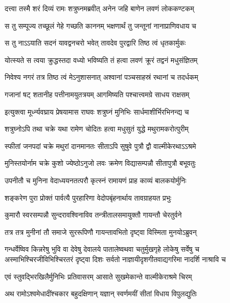 \twolineshloka
{दत्त्वा तस्मै शरं दिव्यं रामः शत्रुघ्नमब्रवीत्}
{अनेन जहि बाणेन लवणं लोककण्टकम्} %

\twolineshloka
{स तु सम्पूज्य तच्छूलं गेहे गच्छति काननम्}
{भक्षणार्थं तु जन्तूनां नानाप्राणिवधाय च} %

\twolineshloka
{स तु नाऽऽयाति सदनं यावद्वनचरो भवेत्}
{तावदेव पुरद्वारि तिष्ठ त्वं धृतकार्मुकः} %

\twolineshloka
{योत्स्यते स त्वया क्रुद्धस्तदा वध्यो भविष्यति}
{तं हत्वा लवणं क्रूरं तद्वनं मधुसंज्ञितम्} %

\twolineshloka
{निवेश्य नगरं तत्र तिष्ठ त्वं मेऽनुशासनात्}
{अश्वानां पञ्चसाहस्रं रथानां च तदर्धकम्} %

\twolineshloka
{गजानां षट् शतानीह पत्तीनामयुतत्रयम्}
{आगमिष्यति पश्चात्त्वमग्रे साधय राक्षसम्} %

\twolineshloka
{इत्युक्त्वा मूर्ध्न्यवघ्राय प्रेषयामास राघवः}
{शत्रुघ्नं मुनिभिः सार्धमाशीर्भिरभिनन्द्य च} %

\twolineshloka
{शत्रुघ्नोऽपि तथा चक्रे यथा रामेण चोदितः}
{हत्वा मधुसुतं युद्धे मथुरामकरोत्पुरीम्} %

\twolineshloka
{स्फीतां जनपदां चक्रे मथुरां दानमानतः}
{सीताऽपि सुषुवे पुत्रौ द्वौ वाल्मीकेरथाऽऽश्रमे} %

\twolineshloka
{मुनिस्तयोर्नाम चक्रे कुशो ज्येष्ठोऽनुजो लवः}
{क्रमेण विद्यासम्पन्नौ सीतापुत्रौ बभूवतुः} %

\twolineshloka
{उपनीतौ च मुनिना वेदाध्ययनतत्परौ}
{कृत्स्नं रामायणं प्राह काव्यं बालकयोर्मुनिः} %

\twolineshloka
{शङ्करेण पुरा प्रोक्तं पार्वत्यै पुरहारिणा}
{वेदोपबृंहनार्थाय तावग्राहयत प्रभुः} %

\twolineshloka
{कुमारौ स्वरसम्पन्नौ सुन्दरावश्विनाविव}
{तन्त्रीतालसमायुक्तौ गायन्तौ चेरतुर्वने} %

\twolineshloka
{तत्र तत्र मुनीनां तौ समाजे सुररूपिणौ}
{गायन्तावभितो दृष्ट्वा विस्मिता मुनयोऽब्रुवन्} %

\fourlineindentedshloka
{गन्धर्वेष्विव किन्नरेषु भुवि वा देवेषु देवालये}
{पातालेष्वथवा चतुर्मुखगृहे लोकेषु सर्वेषु च}
{अस्माभिश्चिरजीविभिश्चिरतरं दृष्ट्वा दिशः सर्वतो}
{नाज्ञायीदृशगीतवाद्यगरिमा नादर्शि नाश्रावि च} %

\twolineshloka
{एवं स्तुवद्भिरखिलैर्मुनिभिः प्रतिवासरम्}
{आसाते सुखमेकान्ते वाल्मीकेराश्रमे चिरम्} %

\twolineshloka
{अथ रामोऽश्वमेधादींश्चकार बहुदक्षिणान्}
{यज्ञान् स्वर्णमयीं सीतां विधाय विपुलद्युतिः} %

